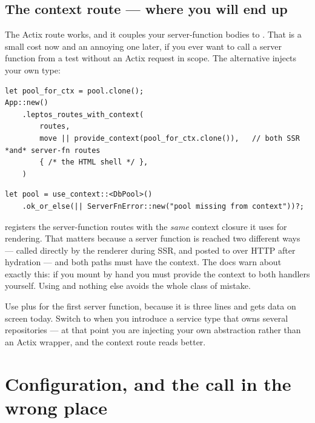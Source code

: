 \subsection{The context route --- where you will end up}

The Actix route works, and it couples your server-function bodies to .
That is a small cost now and an annoying one later, if you ever want to call a server function from
a test without an Actix request in scope. The alternative injects your own type:

\begin{lstlisting}[style=rs]
let pool_for_ctx = pool.clone();
App::new()
    .leptos_routes_with_context(
        routes,
        move || provide_context(pool_for_ctx.clone()),   // both SSR *and* server-fn routes
        { /* the HTML shell */ },
    )
\end{lstlisting}

\begin{lstlisting}[style=rs]
let pool = use_context::<DbPool>()
    .ok_or_else(|| ServerFnError::new("pool missing from context"))?;
\end{lstlisting}

\begin{why}
 registers the server-function routes with the \emph{same}
context closure it uses for rendering. That matters because a server function is reached two
different ways --- called directly by the renderer during SSR, and posted to over HTTP after
hydration --- and both paths must have the context. The  docs warn about
exactly this: if you mount  by hand you must provide the context to both
handlers yourself. Using  and nothing else avoids the whole
class of mistake.
\end{why}

\begin{pattern}
Use  plus  for the first server function, because it is three lines
and gets data on screen today. Switch to  when you introduce a
service type that owns several repositories --- at that point you are injecting your own
abstraction rather than an Actix wrapper, and the context route reads better.
\end{pattern}

\section{Configuration, and the  call in the wrong place}
\label{sec:config}

